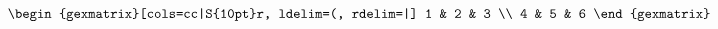 \documentclass{article}
\begin{document}
\begin{equation*}
    \begin{gexmatrix}[cols=cc|S{10pt}r, ldelim=(, rdelim=|]
        1 & 2 & 3 \\
        4 & 5 & 6
    \end{gexmatrix}
\end{equation*}
\end{document}
